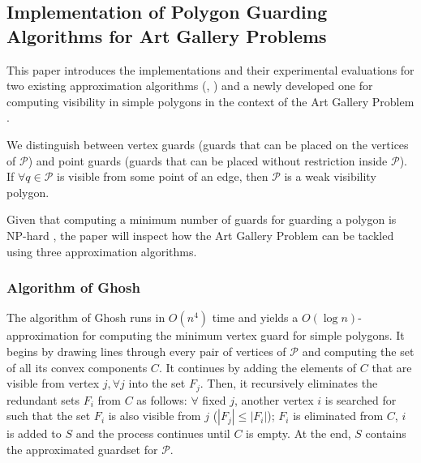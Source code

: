 \subsection{Implementation of Polygon Guarding Algorithms for Art Gallery Problems \cite{maleki2022implementation}}
This paper \cite{maleki2022implementation} introduces the implementations and their experimental evaluations for two existing approximation algorithms (\cite{GHOSH2010718}, \cite{bhattacharya2016approximability}) and a newly developed one for computing visibility in simple polygons in the context of the Art Gallery Problem \cite{o1987art}.

We distinguish between vertex guards (guards that can be placed on the vertices of $\mathcal P$) and point guards (guards that can be placed without restriction inside $\mathcal P$). If $\forall q \in \mathcal P$ is visible from some point of an edge, then $\mathcal P$ is a weak visibility polygon.

Given that computing a minimum number of guards for guarding a polygon is NP-hard \cite{1057165}, the paper will inspect how the Art Gallery Problem \cite{o1987art} can be tackled using three approximation algorithms.

\subsubsection{Algorithm of Ghosh \cite{GHOSH2010718}}
The algorithm of Ghosh \cite{GHOSH2010718} runs in $O(n^4)$ time and yields a $O(\log n)$-approximation for computing the minimum vertex guard for simple polygons. It begins by drawing lines through every pair of vertices of $\mathcal P$ and computing the set of all its convex components $C$. It continues by adding the elements of $C$ that are visible from vertex $j, \forall j$ into the set $F_j$. Then, it recursively eliminates the redundant sets $F_i$ from $C$ as follows: $\forall$ fixed $j$, another vertex $i$ is searched for such that the set $F_i$ is also visible from $j$ ($|F_j| \leq |F_i|$); $F_i$ is eliminated from $C$, $i$ is added to $S$ and the process continues until $C$ is empty. At the end, $S$ contains the approximated guardset for $\mathcal P$.

